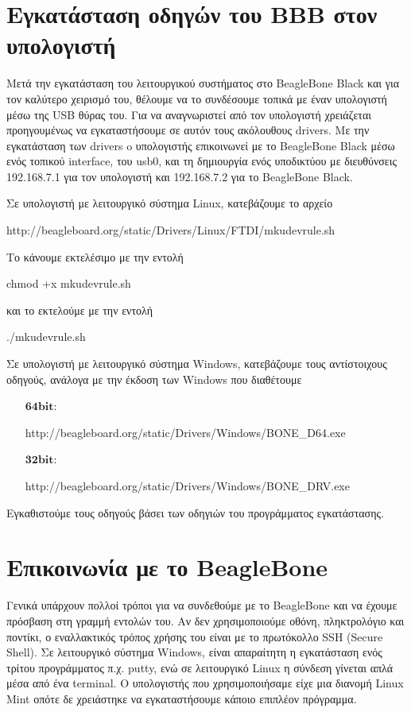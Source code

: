 \documentclass[12pt, a4paper, oneside]{report}
\begin{document}
\section{Εγκατάσταση οδηγών του BBB στον υπολογιστή}

Μετά την εγκατάσταση του λειτουργικού συστήματος στο BeagleBone Black και για τον καλύτερο χειρισμό του, θέλουμε να το συνδέσουμε τοπικά με έναν υπολογιστή μέσω της USB θύρας του. Για να αναγνωριστεί από τον υπολογιστή χρειάζεται προηγουμένως να εγκαταστήσουμε σε αυτόν τους ακόλουθους drivers. Με την εγκατάσταση των drivers o υπολογιστής επικοινωνεί με το BeagleBone Black μέσω ενός τοπικού interface, του usb0, και τη δημιουργία ενός υποδικτύου με διευθύνσεις 192.168.7.1 για τον υπολογιστή και 192.168.7.2 για το BeagleBone Black.

Σε υπολογιστή με λειτουργικό σύστημα Linux, κατεβάζουμε το αρχείο
\begin{code}
http://beagleboard.org/static/Drivers/Linux/FTDI/mkudevrule.sh
\end{code}
Το κάνουμε εκτελέσιμο με την εντολή
\begin{code}
chmod +x mkudevrule.sh
\end{code}
και το εκτελούμε με την εντολή
\begin{code}
./mkudevrule.sh
\end{code}

Σε υπολογιστή με λειτουργικό σύστημα Windows, κατεβάζουμε τους αντίστοιχους οδηγούς, ανάλογα με την έκδοση των Windows που διαθέτουμε
\begin{itemize}
\item[$\textbf{64bit:}$] \begin{code}
http://beagleboard.org/static/Drivers/Windows/BONE_D64.exe
\end{code}

\item[$\textbf{32bit:}$] \begin{code}
http://beagleboard.org/static/Drivers/Windows/BONE_DRV.exe
\end{code}
\end{itemize}

Εγκαθιστούμε τους οδηγούς βάσει των οδηγιών του προγράμματος εγκατάστασης.

\section{Επικοινωνία με το BeagleBone}

Γενικά υπάρχουν πολλοί τρόποι για να συνδεθούμε με το BeagleBone και να έχουμε πρόσβαση στη γραμμή εντολών του. Αν δεν χρησιμοποιούμε οθόνη, πληκτρολόγιο και ποντίκι, ο εναλλακτικός τρόπος χρήσης του είναι με το πρωτόκολλο SSH (Secure Shell). Σε λειτουργικό σύστημα Windows, είναι απαραίτητη η εγκατάσταση ενός τρίτου προγράμματος π.χ. putty, ενώ σε λειτουργικό Linux η σύνδεση γίνεται απλά μέσα από ένα terminal. Ο υπολογιστής που χρησιμοποιήσαμε είχε μια διανομή Linux Mint οπότε δε χρειάστηκε να εγκαταστήσουμε κάποιο επιπλέον πρόγραμμα.
\end{document}
